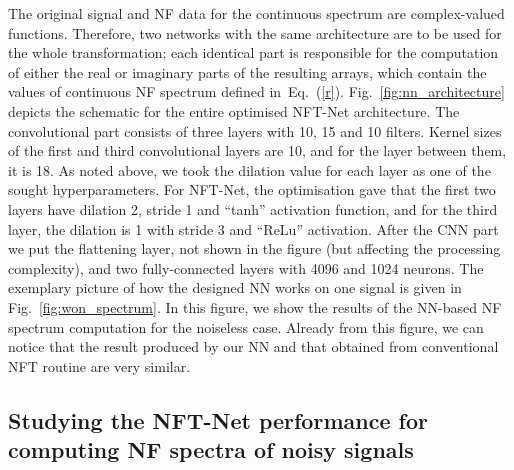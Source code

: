
The original signal and NF data for the continuous spectrum are complex-valued functions. Therefore, two networks with the same architecture are to be used for the whole transformation; each identical part is responsible for the computation of either the real or imaginary parts of the resulting arrays, which contain the values of continuous NF spectrum defined in~Eq.~(\ref{r}).  Fig.~\ref{fig:nn_architecture} depicts the schematic for the entire optimised NFT-Net architecture. The convolutional part consists of three layers with 10, 15 and 10 filters. Kernel sizes of the first and third convolutional layers are 10, and for the layer between them, it is 18. As noted above, we took the dilation value for each layer as one of the sought hyperparameters. For NFT-Net, the optimisation gave that the first two layers have dilation 2, stride 1 and ``tanh'' activation function, and for the third layer, the dilation is 1 with stride 3 and ``ReLu''  activation. After the CNN part we put the flattening layer, not shown in the figure (but affecting the processing complexity), and two fully-connected layers with 4096 and 1024 neurons. The exemplary picture of how the designed NN works on one signal is given in Fig.~\ref{fig:won_spectrum}. In this figure, we show the results of the NN-based NF spectrum computation for the noiseless case. Already from this figure, we can notice that the result produced by our NN and that obtained from conventional NFT routine\cite{FNFT2018} are very similar. 


\subsection*{Studying the NFT-Net performance for computing NF spectra of noisy signals}

